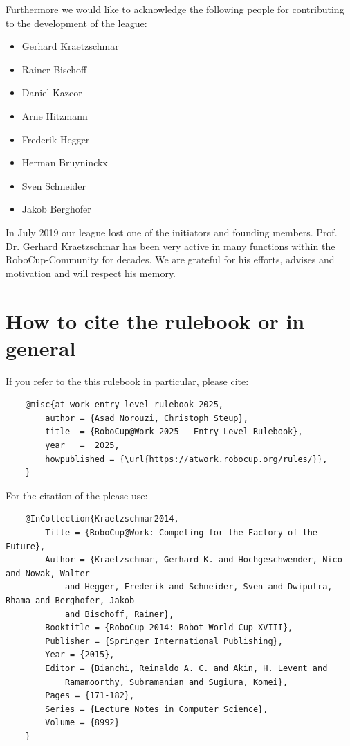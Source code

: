 \begin{titlepage}
Furthermore we would like to acknowledge the following people for contributing to the development
of the \RCAW league:

\begin{itemize}
	\item Gerhard Kraetzschmar
	\item Rainer Bischoff
	\item Daniel Kazcor
	\item Arne Hitzmann
	\item Frederik Hegger
	\item Herman Bruyninckx
	\item Sven Schneider
	\item Jakob Berghofer
\end{itemize}
In July 2019 our league lost one of the initiators and founding members. Prof. Dr. Gerhard
Kraetzschmar has been very active in many functions within the RoboCup-Community
for decades. We are grateful for his efforts, advises and motivation and will respect his memory.


\begin{minipage}{\textwidth}
\section*{How to cite the rulebook or \RCAW in general}
If you refer to the this rulebook in particular, please cite:

\begin{verbatim}
	@misc{at_work_entry_level_rulebook_2025,
		author = {Asad Norouzi, Christoph Steup},
		title  = {RoboCup@Work 2025 - Entry-Level Rulebook},
		year   =  2025,
		howpublished = {\url{https://atwork.robocup.org/rules/}},
	}
\end{verbatim}


For the citation of the \RCAW please use:
\begin{verbatim}
	@InCollection{Kraetzschmar2014,
		Title = {RoboCup@Work: Competing for the Factory of the Future},
		Author = {Kraetzschmar, Gerhard K. and Hochgeschwender, Nico and Nowak, Walter
			and Hegger, Frederik and Schneider, Sven and Dwiputra, Rhama and Berghofer, Jakob
			and Bischoff, Rainer},
		Booktitle = {RoboCup 2014: Robot World Cup XVIII},
		Publisher = {Springer International Publishing},
		Year = {2015},
		Editor = {Bianchi, Reinaldo A. C. and Akin, H. Levent and
			Ramamoorthy, Subramanian and Sugiura, Komei},
		Pages = {171-182},
		Series = {Lecture Notes in Computer Science},
		Volume = {8992}
	}
\end{verbatim}
\end{minipage}




\end{titlepage}
